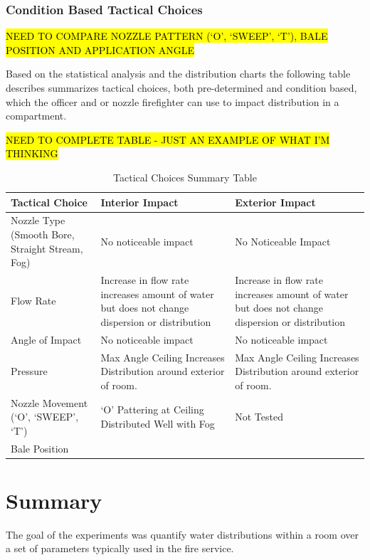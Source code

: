 \documentclass[12pt,oneside]{book}
\begin{document}
\subsection{Condition Based Tactical Choices}

\hl{NEED TO COMPARE NOZZLE PATTERN (`O', `SWEEP', `T'), BALE POSITION AND APPLICATION ANGLE}


Based on the statistical analysis and the distribution charts the following table describes summarizes tactical choices, both pre-determined and condition based, which the officer and or nozzle firefighter can use to impact distribution in a compartment.

\hl{NEED TO COMPLETE TABLE - JUST AN EXAMPLE OF WHAT I'M THINKING}

\begin{table}[!ht]
\centering
\caption{Tactical Choices Summary Table}
\label{tab:tac_choice}
\begin{tabular}{L{5cm}L{5cm}L{5cm}}
\toprule[1.5pt]
Tactical Choice & Interior Impact & Exterior Impact \\
\midrule
Nozzle Type (Smooth Bore, Straight Stream, Fog) & No noticeable impact & No Noticeable Impact \\ [.5cm]
Flow Rate & Increase in flow rate increases amount of water but does not change dispersion or distribution & Increase in flow rate increases amount of water but does not change dispersion or distribution \\ [.5cm]
Angle of Impact & No noticeable impact & No noticeable impact \\ [.5cm]
Pressure & Max Angle Ceiling Increases Distribution around exterior of room.  & Max Angle Ceiling Increases Distribution around exterior of room. \\ [.5cm]
Nozzle Movement (`O', `SWEEP', `T') & `O' Pattering at Ceiling Distributed Well with Fog & Not Tested \\ [.5cm]
Bale Position & & \\ [.5cm]

\bottomrule[1.25pt]
\end{tabular}
\end{table}

\chapter{Summary}

The goal of the experiments was quantify water distributions within a room over a set of parameters typically used in the fire service. 
\end{document}
